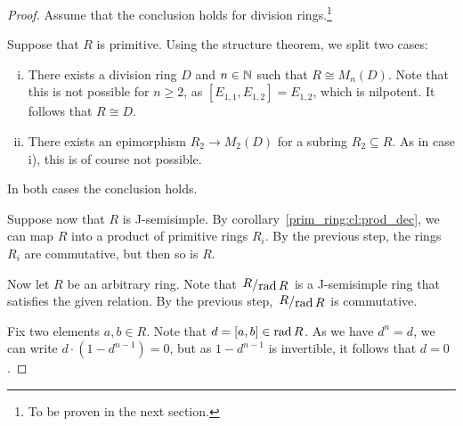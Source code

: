 \begin{proof}
Assume that the conclusion holds for division rings.\footnote{To be
proven in the next section.}

Suppose that $R$ is primitive. Using the structure theorem, we
split two cases:

\begin{enumerate}[i)]
\item There exists a division ring $D$ and $n \in \mathbb{N}$ such that
$R \cong M_n(D)$. Note that this is not possible for $n \geq 2$, as
$[E_{1,1}, E_{1,2}] = E_{1,2}$, which is nilpotent. It follows that
$R \cong D$.
\item There exists an epimorphism $R_2 \to M_2(D)$ for a subring
$R_2 \subseteq R$. As in case i), this is of course not possible.
\end{enumerate}

In both cases the conclusion holds.

Suppose now that $R$ is J-semisimple. By
corollary~\ref{prim_ring:cl:prod_dec}, we can map $R$ into a
product of primitive rings $R_i$. By the previous step, the rings
$R_i$ are commutative, but then so is $R$.

Now let $R$ be an arbitrary ring. Note that $\kvoc{R}{\rad R}$ is a
J-semisimple ring that satisfies the given relation. By the
previous step, $\kvoc{R}{\rad R}$ is commutative.

Fix two elements $a, b \in R$. Note that $d = [a, b] \in \operatorname{rad} R$.
As we have $d^n = d$, we can write $d \cdot (1 - d^{n-1}) = 0$, but
as $1 - d^{n-1}$ is invertible, it follows that $d = 0$.
\end{proof}
